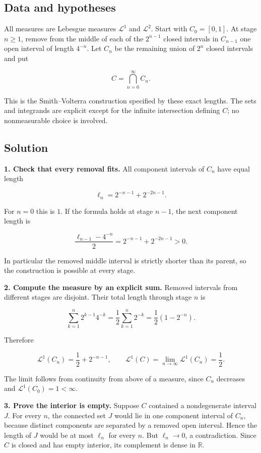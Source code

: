 \documentclass[
  11pt,
]{article}
\begin{document}
\subsection{Data and hypotheses}\label{data-and-hypotheses-1}

All measures are Lebesgue measures \(\mathcal L^1\) and
\(\mathcal L^2\). Start with \(C_0=[0,1]\). At stage \(n\geq1\), remove
from the middle of each of the \(2^{n-1}\) closed intervals in
\(C_{n-1}\) one open interval of length \(4^{-n}\). Let \(C_n\) be the
remaining union of \(2^n\) closed intervals and put

\[
C=\bigcap_{n=0}^{\infty}C_n.
\]

This is the Smith--Volterra construction specified by these exact
lengths. The sets and integrands are explicit except for the infinite
intersection defining \(C\); no nonmeasurable choice is involved.

\subsection{Solution}\label{solution-1}

\textbf{1. Check that every removal fits.} All component intervals of
\(C_n\) have equal length

\[
\ell_n=2^{-n-1}+2^{-2n-1}.
\]

For \(n=0\) this is \(1\). If the formula holds at stage \(n-1\), the
next component length is

\[
\frac{\ell_{n-1}-4^{-n}}2
=2^{-n-1}+2^{-2n-1}>0.
\]

In particular the removed middle interval is strictly shorter than its
parent, so the construction is possible at every stage.

\textbf{2. Compute the measure by an explicit sum.} Removed intervals
from different stages are disjoint. Their total length through stage
\(n\) is

\[
\sum_{k=1}^{n}2^{k-1}4^{-k}
=\frac12\sum_{k=1}^{n}2^{-k}
=\frac12(1-2^{-n}).
\]

Therefore

\[
\mathcal L^1(C_n)=\frac12+2^{-n-1},\qquad
\mathcal L^1(C)=\lim_{n\to\infty}\mathcal L^1(C_n)=\frac12.
\]

The limit follows from continuity from above of a measure, since \(C_n\)
decreases and \(\mathcal L^1(C_0)=1<\infty\).

\textbf{3. Prove the interior is empty.} Suppose \(C\) contained a
nondegenerate interval \(J\). For every \(n\), the connected set \(J\)
would lie in one component interval of \(C_n\), because distinct
components are separated by a removed open interval. Hence the length of
\(J\) would be at most \(\ell_n\) for every \(n\). But \(\ell_n\to0\), a
contradiction. Since \(C\) is closed and has empty interior, its
complement is dense in \(\mathbb R\).
\end{document}
